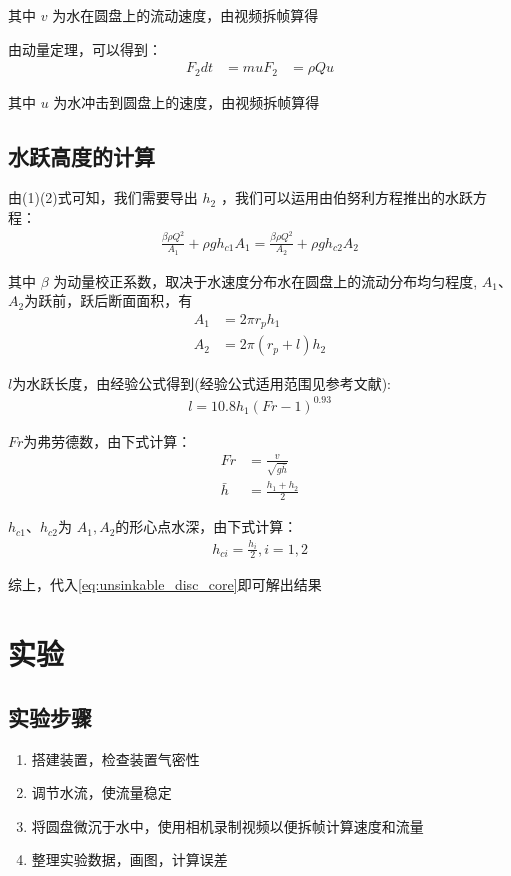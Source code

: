 \documentclass[UTF8]{gapd}
\begin{document}
其中 $v$ 为水在圆盘上的流动速度，由视频拆帧算得

由动量定理，可以得到：
\begin{align}
    F_2dt&=mu
    F_2&=\rho Q u
\end{align}

其中 $u$  为水冲击到圆盘上的速度，由视频拆帧算得
\subsection{水跃高度的计算}
由(1)(2)式可知，我们需要导出  $h_2$  ，我们可以运用由伯努利方程推出的水跃方程\cite{article:1}：
\begin{align}
    \frac{\beta \rho Q^2}{A_1}+\rho g h_{c1}A_1=\frac{\beta \rho Q^2}{A_2}+\rho g h_{c2}A_2
\end{align}

其中  $\beta$ 为动量校正系数，取决于水速度分布水在圆盘上的流动分布均匀程度,
$A_1$、$A_2$为跃前，跃后断面面积，有
\begin{align}
    A_1&=2\pi r_p h_1\\
    A_2&=2\pi(r_p+l)h_2
\end{align}

\noindent$l$为水跃长度，由经验公式得到(经验公式适用范围见参考文献\cite{book:1}):
\begin{align}
    l=10.8h_1(Fr-1)^{0.93}
\end{align}

\noindent$Fr$为弗劳德数，由下式计算\cite{article:2}：
\begin{align}
    Fr&=\frac{v}{\sqrt{g \bar{h}}}\\
    \bar{h}&=\frac{h_1+h_2}{2}
\end{align}

$h_{c1}$、$h_{c2}$为 $A_1,A_2$的形心点水深，由下式计算：
\begin{align}
    h_{ci}=\frac{h_i}{2},i=1,2
\end{align}

综上，代入\eqref{eq:unsinkable_disc_core}即可解出结果
\section{实验}
\label{sec:unsinkable_disc_experiment}
\subsection{实验步骤}
\begin{enumerate}
    \item 搭建装置，检查装置气密性
    \item 调节水流，使流量稳定
    \item 将圆盘微沉于水中，使用相机录制视频以便拆帧计算速度和流量
    \item 整理实验数据，画图，计算误差
\end{enumerate}
\end{document}

